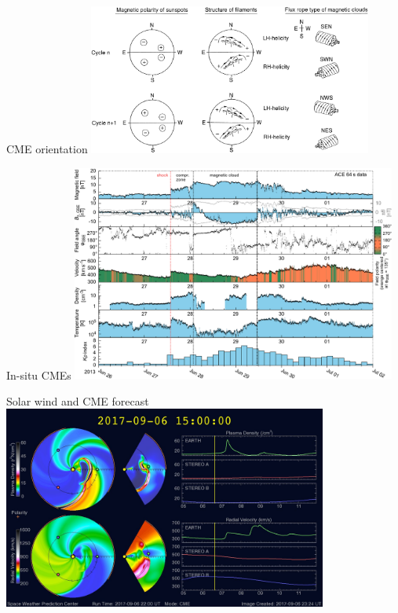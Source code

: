 \begin{frame}[c]{CME orientation}{}
	\includegraphics[width=0.7\textwidth]{../figures_of_others/images/Bothmer1998_fig18.png}
\end{frame}
\begin{frame}[c]{In-situ CMEs}{}
	\includegraphics[width=0.8\textwidth]{../figures_of_mine/gnuplots/ACE_64s_v7_thesis_CME_2013-6-26_6.pdf}
\end{frame}
\begin{frame}[c]{Solar wind and CME forecast}{}
	\includegraphics[width=0.8\textwidth]{../figures_of_others/images/enlil_com1_20170906T150000.jpg}
\end{frame}


